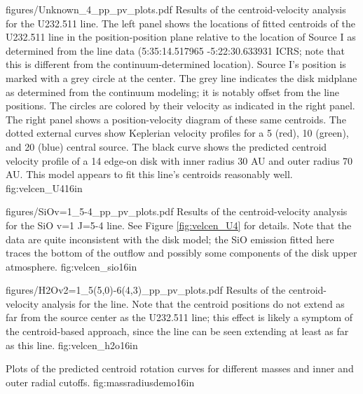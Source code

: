 \documentclass[twocolumn]{aastex61}
\begin{document}
\Figure
{figures/Unknown_4_pp_pv_plots.pdf}
{Results of the centroid-velocity analysis for the U232.511 line.
The left panel shows the locations of fitted centroids of the U232.511 line in
the position-position plane relative to the location of Source I as determined
from the line data (5:35:14.517965 -5:22:30.633931 ICRS; note that this is
different from the continuum-determined location).  Source I's position is
marked with a grey circle at the center.  The grey line indicates the disk
midplane as determined from the continuum modeling; it is notably offset from
the line positions.  The circles are colored by their velocity as indicated in
the right panel.  The right panel shows a position-velocity diagram of these
same centroids.  The dotted external curves show Keplerian velocity profiles
for a 5 (red), 10 (green), and 20 (blue) \msun central source.  The black
curve shows the predicted centroid velocity profile of a 14 \msun  edge-on disk
with inner radius 30 AU and outer radius 70 AU.
This model appears to fit this line's centroids reasonably well.
}
{fig:velcen_U4}{1}{6in}

\Figure
{figures/SiOv=1_5-4_pp_pv_plots.pdf}
{Results of the centroid-velocity analysis for the SiO v=1 J=5-4 line.
See Figure \ref{fig:velcen_U4} for details.
Note that the data are quite inconsistent with the disk model;
the SiO emission fitted here traces the bottom of the outflow
and possibly some components of the disk upper atmosphere.
}
{fig:velcen_sio}{1}{6in}

\Figure
{figures/H2Ov2=1_5(5,0)-6(4,3)_pp_pv_plots.pdf}
{Results of the centroid-velocity analysis for the \water line.
Note that the centroid positions do not extend as far from
the source center as the U232.511 line; this effect is likely
a symptom of the centroid-based approach, since the \water
line can be seen extending at least as far as this line.
}
{fig:velcen_h2o}{1}{6in}

{Plots of the predicted centroid rotation curves for different masses
and inner and outer radial cutoffs.}
{fig:massradiusdemo}{1}{6in}

\end{document}
